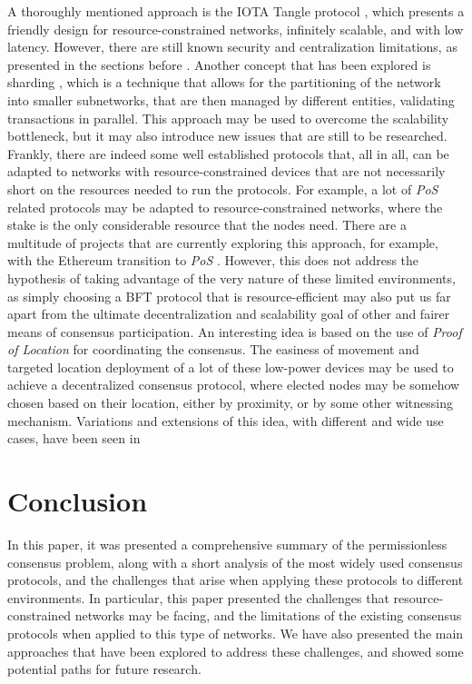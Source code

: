 \documentclass[journal]{IEEEtran}
\begin{document}
A thoroughly mentioned approach is the IOTA Tangle protocol \cite{popov2018tangle}, which
presents a friendly design for resource-constrained networks, infinitely scalable, and with low latency.
However, there are still known security and centralization limitations, as presented in the sections before \cite{8168250}.
Another concept that has been explored is sharding \cite{SALIMITARI2020100212, queralta2021blockchain}, which is a
technique that allows for the partitioning of the network into smaller subnetworks,
that are then managed by different entities, validating transactions in parallel. 
This approach may be used to overcome the scalability bottleneck,
but it may also introduce new issues that are still to be researched.
Frankly, there are indeed some well established protocols that, all in all, can be adapted to networks with
resource-constrained devices that are not necessarily short on the resources needed to run the protocols.
For example, a lot of \emph{PoS} related protocols may be adapted to resource-constrained networks, where 
the stake is the only considerable resource that the nodes need. There are a multitude of projects that are
currently exploring this approach, for example, with the Ethereum transition to \emph{PoS} \cite{buterin2017casper}.
However, this does not address the hypothesis of taking advantage of the very nature of these limited environments, 
as simply choosing a BFT protocol that is resource-efficient
may also put us far apart from the ultimate decentralization and scalability goal of 
other and fairer means of consensus participation.
An interesting idea is based on the use of \emph{Proof of Location} for 
coordinating the consensus. The easiness of movement and targeted location deployment
of a lot of these low-power devices may be used to achieve a decentralized consensus
protocol, where elected nodes may be somehow chosen based on their location, 
either by proximity, or by some other witnessing mechanism. Variations and 
extensions of this idea, with different and wide use cases, have been seen in
\cite{foam2018location, xyo2018location}

\section{Conclusion}

In this paper, it was presented a comprehensive summary of the permissionless
consensus problem, along with a short analysis of the most widely used consensus 
protocols, and the challenges that arise when applying these protocols to different environments.
In particular, this paper presented the challenges that resource-constrained networks may be facing, 
and the limitations of the existing consensus protocols when applied to this type of networks.
We have also presented the main approaches that have been explored to address these challenges,
and showed some potential paths for future research.
\end{document}
